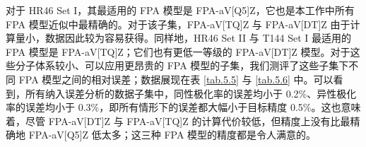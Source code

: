 对于 HR46 Set I，其最适用的 FPA 模型是 FPA-aV[Q5]Z，它也是本工作中所有 FPA 模型近似中最精确的。对于该子集，FPA-aV[TQ]Z 与 FPA-aV[DT]Z 由于计算量小，数据因此较为容易获得。同样地，HR46 Set II 与 T144 Set I 最适用的 FPA 模型是 FPA-aV[TQ]Z；它们也有更低一等级的 FPA-aV[DT]Z 模型。对于这些分子体系较小、可以应用更昂贵的 FPA 模型的子集，我们测评了这些子集下不同 FPA 模型之间的相对误差；数据展现在表 \ref{tab.5.5} 与 \ref{tab.5.6} 中。可以看到，所有纳入误差分析的数据子集中，同性极化率的误差均小于 0.2\%、异性极化率的误差均小于 0.3\%，即所有情形下的误差都大幅小于目标精度 0.5\%。这也意味着，尽管 FPA-aV[DT]Z 与 FPA-aV[TQ]Z 的计算代价较低，但精度上没有比最精确地 FPA-aV[Q5]Z 低太多；这三种 FPA 模型的精度都是令人满意的。

\begin{table}[!ht]
\centering
\caption{HR46 与 T144 子集下同性极化率 $\symup{\Delta} \tilde \alpha_\textsf{CCSD(T)}$ 在不同 FPA 模型下的相对方均根误差\textrm{\textsuperscript{\emph{a}}}。}
\label{tab.5.5}
\end{table}

